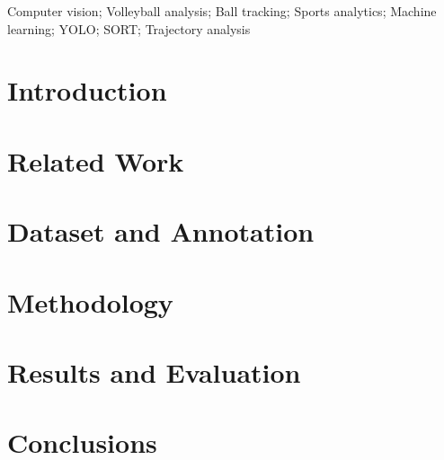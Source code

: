 \documentclass[conference, letterpaper]{IEEEtran}
\begin{document}


\begin{IEEEkeywords}
Computer vision; Volleyball analysis; Ball tracking; Sports analytics; Machine learning; YOLO; SORT; Trajectory analysis
\end{IEEEkeywords}


%
\IEEEpeerreviewmaketitle



\section{Introduction}


\section{Related Work}


\section{Dataset and Annotation}


\section{Methodology}


\section{Results and Evaluation}


\section{Conclusions}


\end{document}
